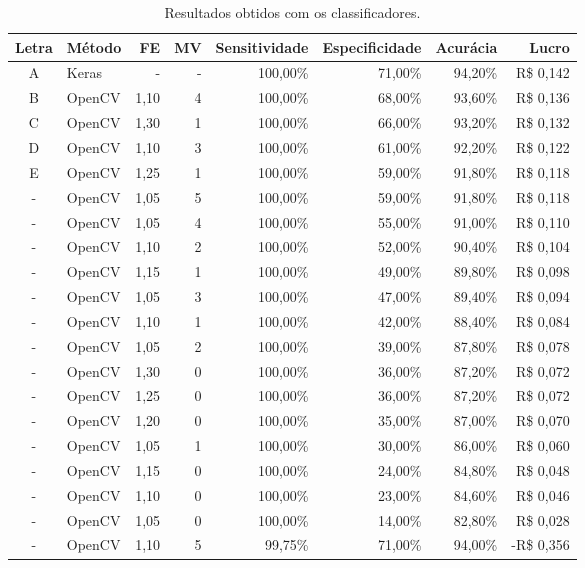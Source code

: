  \begin{table}[htbp]
     \caption{Resultados obtidos com os classificadores.}
     \label{tab:results_identify}
     \centering
     \begin{tabular}{clrrrrrr}
     Letra & Método & FE & MV & Sensitividade & Especificidade & Acurácia & Lucro \\
      \midrule
      A & Keras  & - & - & 100,00\% & 71,00\% & 94,20\% & R\$ 0,142 \\
      B & OpenCV & 1,10 & 4 & 100,00\% & 68,00\% & 93,60\% & R\$ 0,136 \\
      C & OpenCV & 1,30 & 1 & 100,00\% & 66,00\% & 93,20\% & R\$ 0,132 \\
      D & OpenCV & 1,10 & 3 & 100,00\% & 61,00\% & 92,20\% & R\$ 0,122 \\
      E & OpenCV & 1,25 & 1 & 100,00\% & 59,00\% & 91,80\% & R\$ 0,118 \\
      - & OpenCV & 1,05 & 5 & 100,00\% & 59,00\% & 91,80\% & R\$ 0,118 \\
      - & OpenCV & 1,05 & 4 & 100,00\% & 55,00\% & 91,00\% & R\$ 0,110 \\
      - & OpenCV & 1,10 & 2 & 100,00\% & 52,00\% & 90,40\% & R\$ 0,104 \\
      - & OpenCV & 1,15 & 1 & 100,00\% & 49,00\% & 89,80\% & R\$ 0,098 \\
      - & OpenCV & 1,05 & 3 & 100,00\% & 47,00\% & 89,40\% & R\$ 0,094 \\
      - & OpenCV & 1,10 & 1 & 100,00\% & 42,00\% & 88,40\% & R\$ 0,084 \\
      - & OpenCV & 1,05 & 2 & 100,00\% & 39,00\% & 87,80\% & R\$ 0,078 \\
      - & OpenCV & 1,30 & 0 & 100,00\% & 36,00\% & 87,20\% & R\$ 0,072 \\
      - & OpenCV & 1,25 & 0 & 100,00\% & 36,00\% & 87,20\% & R\$ 0,072 \\
      - & OpenCV & 1,20 & 0 & 100,00\% & 35,00\% & 87,00\% & R\$ 0,070 \\
      - & OpenCV & 1,05 & 1 & 100,00\% & 30,00\% & 86,00\% & R\$ 0,060 \\
      - & OpenCV & 1,15 & 0 & 100,00\% & 24,00\% & 84,80\% & R\$ 0,048 \\
      - & OpenCV & 1,10 & 0 & 100,00\% & 23,00\% & 84,60\% & R\$ 0,046 \\
      - & OpenCV & 1,05 & 0 & 100,00\% & 14,00\% & 82,80\% & R\$ 0,028 \\
      - & OpenCV & 1,10 & 5 & 99,75\% & 71,00\% & 94,00\% & -R\$ 0,356 \\

\end{tabular}
\end{table}
